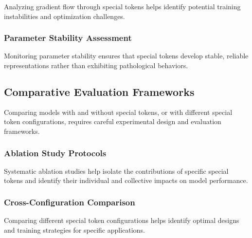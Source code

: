 Analyzing gradient flow through special tokens helps identify potential training instabilities and optimization challenges.

\subsubsection{Parameter Stability Assessment}

Monitoring parameter stability ensures that special tokens develop stable, reliable representations rather than exhibiting pathological behaviors.

\subsection{Comparative Evaluation Frameworks}

Comparing models with and without special tokens, or with different special token configurations, requires careful experimental design and evaluation frameworks.

\subsubsection{Ablation Study Protocols}

Systematic ablation studies help isolate the contributions of specific special tokens and identify their individual and collective impacts on model performance.

\subsubsection{Cross-Configuration Comparison}

Comparing different special token configurations helps identify optimal designs and training strategies for specific applications.